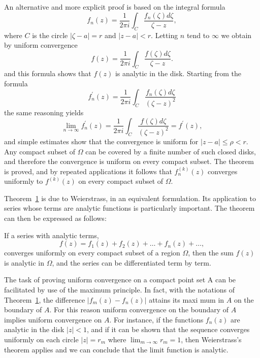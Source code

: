 An alternative and more explicit proof is based on the integral formula
\begin{equation*}
f _ {n} (z) = \frac {1}{2 \pi i} \int_ {C} \frac {f _ {n} (\zeta) d \zeta}{\zeta - z},
\end{equation*}
where $C$ is the circle $|\zeta - a| = r$ and $|z - a| < r$. Letting $n$ tend to $\infty$ we obtain by uniform convergence
\begin{equation*}
f (z) = \frac {1}{2 \pi i} \int_ {C} \frac {f (\zeta) d \zeta}{\zeta - z}.
\end{equation*}
and this formula shows that $f(z)$ is analytic in the disk. Starting from the formula
\begin{equation*}
f _ {n} ^ {\prime} (z) = \frac {1}{2 \pi i} \int_ {C} \frac {f _ {n} (\zeta) d \zeta}{(\zeta - z) ^ {2}}
\end{equation*}
the same reasoning yields
\begin{equation*}
\lim _ {n \rightarrow \infty} f _ {n} ^ {\prime} (z) = \frac {1}{2 \pi i} \int_ {C} \frac {f (\zeta) d \zeta}{(\zeta - z) ^ {2}} = f ^ {\prime} (z),
\end{equation*}
and simple estimates show that the convergence is uniform for $|z - a| \leq \rho < r$. Any compact subset of $\Omega$ can be covered by a finite number of such closed disks, and therefore the convergence is uniform on every compact subset. The theorem is proved, and by repeated applications it follows that $f_{n}^{(k)}(z)$ converges uniformly to $f^{(k)}(z)$ on every compact subset of $\Omega$.

Theorem~\hyperref[thm:5.1]{1} is due to Weierstrass, in an equivalent formulation. Its application to series whose terms are analytic functions is particularly important. The theorem can then be expressed as follows:

\begin{originalassertion}
If a series with analytic terms,
\begin{equation*}
f (z) = f _ {1} (z) + f _ {2} (z) + \dots + f _ {n} (z) + \dots ,
\end{equation*}
converges uniformly on every compact subset of a region $\Omega$, then the sum $f(z)$ is analytic in $\Omega$, and the series can be differentiated term by term.
\end{originalassertion}

The task of proving uniform convergence on a compact point set A can be facilitated by use of the maximum principle. In fact, with the notations of Theorem~\hyperref[thm:5.1]{1}, the difference $|f_{m}(z) - f_{n}(z)|$ attains its maxi%
%
mum in $A$ on the boundary of $A$. For this reason uniform convergence on the boundary of $A$ implies uniform convergence on $A$. For instance, if the functions $f_n(z)$ are analytic in the disk $|z| < 1$, and if it can be shown that the sequence converges uniformly on each circle $|z| = r_m$ where $\lim_{m \to \infty} r_m = 1$, then Weierstrass's theorem applies and we can conclude that the limit function is analytic.

